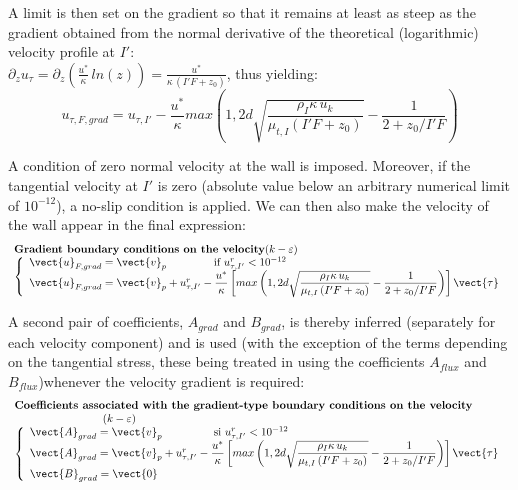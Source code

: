 A limit is then set on the gradient so that it remains at least as steep as the
gradient obtained from the normal derivative of the theoretical (logarithmic) velocity
profile at $I'$:\\
$\partial_z u_{\tau} = \partial_z (\displaystyle
\frac{u^*}{\kappa}\,ln{ (z)} ) =\displaystyle\frac{u^*}{\kappa\,\left(I'F + z_0\right) }$, thus
yielding:
\begin{equation}
u_{\tau,F,grad} =u_{\tau,I'}-\displaystyle\frac{u^*}{\kappa}max\left(1,
2d\sqrt{\displaystyle\frac{\rho_I\kappa\, u_k }{\mu_{t,I} \left(I'F + z_0\right)}}-\displaystyle\frac{1}{2 + z_0/I'F}\right)
\end{equation}


A condition of zero normal velocity at the wall is imposed.
Moreover, if the tangential velocity at $I'$ is zero
(absolute value below an arbitrary numerical limit of
$10^{-12}$), a no-slip condition is applied. We can then
also make the velocity of the wall appear in the final expression:
\begin{equation}
\begin{array}{l}
\text{\bf Gradient boundary conditions on the velocity} (k-\varepsilon)\\
\left\{\begin{array}{l}
\vect{u}_{F,grad}=\vect{v}_p
          \qquad\qquad\text{ if } u^r_{\tau,I'} < 10^{-12}  \\
\vect{u}_{F,grad}=\vect{v}_p +
u^r_{\tau,I'}-\displaystyle\frac{u^*}{\kappa}\left[max\left(1,2d\sqrt{\displaystyle\frac{\rho_I\kappa\, u_k }{\mu_{t,I}
\left(I'F + z_0\right)}}-\displaystyle\frac{1}{2 + z_0/I'F}\right)\right] \vect{\tau}
\end{array}\right.
\end{array}
\end{equation}

A second pair of coefficients, $A_{grad}$ and $B_{grad}$, is thereby inferred (separately
for each velocity component) and is used (with the exception of the terms depending on the
tangential stress, these being treated in  using the coefficients $A_{flux}$
and $B_{flux}$)whenever the velocity gradient is required:
\begin{equation}
\begin{array}{l}
\text{\bf Coefficients associated with the gradient-type boundary conditions on the velocity }\\
\qquad\qquad\qquad\qquad\text{\bf} (k-\varepsilon)\\
\left\{\begin{array}{l}
\vect{A}_{grad}=\vect{v}_p
                    \qquad\qquad\text{ \ si\ } u^r_{\tau,I'} < 10^{-12}  \\
\vect{A}_{grad}=\vect{v}_p+
 u^r_{\tau,I'}-\displaystyle\frac{u^*}{\kappa}\left[max\left(1,2d\sqrt{\displaystyle\frac{\rho_I\kappa\, u_k }{\mu_{t,I}
\left(I'F + z_0\right)}}-\displaystyle\frac{1}{2 + z_0/I'F}\right)\right] \vect{\tau}\\
\vect{B}_{grad} = \vect{0}
\end{array}\right.
\end{array}
\end{equation}

